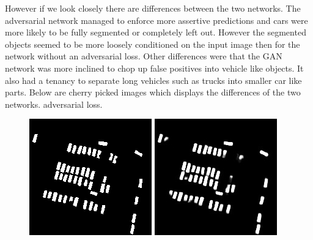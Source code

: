 \documentclass[a4paper,11pt]{article}
\begin{document}
However if we look closely there are differences between the two networks. The adversarial network managed to enforce more assertive predictions and cars were more likely to be fully segmented or completely left out. However the segmented objects seemed to be more loosely conditioned on the input image then for the network without an adversarial loss. Other differences were that the GAN network was more inclined to chop up false positives into vehicle like objects. It also had a tenancy to separate long vehicles such as trucks into smaller car like parts. Below are cherry picked images which displays the differences of the two networks. adversarial loss.
\begin{figure}[H]
  \includegraphics[width=\linewidth]{gan_vs_class/label_1}
\endminipage\hfill
{}
  \includegraphics[width=\linewidth]{gan_vs_class/class_1}

\end{figure}
\end{document}
